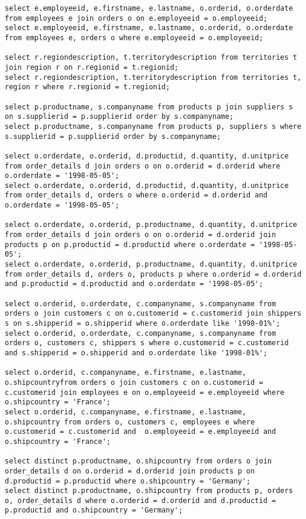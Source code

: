 \documentclass{article}
\begin{document}
        \begin{lstlisting}
select e.employeeid, e.firstname, e.lastname, o.orderid, o.orderdate from employees e join orders o on e.employeeid = o.employeeid;
select e.employeeid, e.firstname, e.lastname, o.orderid, o.orderdate from employees e, orders o where e.employeeid = o.employeeid;

select r.regiondescription, t.territorydescription from territories t join region r on r.regionid = t.regionid;
select r.regiondescription, t.territorydescription from territories t, region r where r.regionid = t.regionid;

select p.productname, s.companyname from products p join suppliers s on s.supplierid = p.supplierid order by s.companyname;
select p.productname, s.companyname from products p, suppliers s where s.supplierid = p.supplierid order by s.companyname;

select o.orderdate, o.orderid, d.productid, d.quantity, d.unitprice from order_details d join orders o on o.orderid = d.orderid where o.orderdate = '1998-05-05';
select o.orderdate, o.orderid, d.productid, d.quantity, d.unitprice from order_details d, orders o where o.orderid = d.orderid and o.orderdate = '1998-05-05';

select o.orderdate, o.orderid, p.productname, d.quantity, d.unitprice from order_details d join orders o on o.orderid = d.orderid join products p on p.productid = d.productid where o.orderdate = '1998-05-05';
select o.orderdate, o.orderid, p.productname, d.quantity, d.unitprice from order_details d, orders o, products p where o.orderid = d.orderid and p.productid = d.productid and o.orderdate = '1998-05-05';

select o.orderid, o.orderdate, c.companyname, s.companyname from orders o join customers c on o.customerid = c.customerid join shippers s on s.shipperid = o.shipperid where o.orderdate like '1998-01%';
select o.orderid, o.orderdate, c.companyname, s.companyname from orders o, customers c, shippers s where o.customerid = c.customerid and s.shipperid = o.shipperid and o.orderdate like '1998-01%';

select o.orderid, c.companyname, e.firstname, e.lastname, o.shipcountryfrom orders o join customers c on o.customerid = c.customerid join employees e on o.employeeid = e.employeeid where o.shipcountry = 'France';
select o.orderid, c.companyname, e.firstname, e.lastname, o.shipcountry from orders o, customers c, employees e where o.customerid = c.customerid and  o.employeeid = e.employeeid and o.shipcountry = 'France';

select distinct p.productname, o.shipcountry from orders o join order_details d on o.orderid = d.orderid join products p on  d.productid = p.productid where o.shipcountry = 'Germany'; 
select distinct p.productname, o.shipcountry from products p, orders o, order_details d where o.orderid = d.orderid and d.productid = p.productid and o.shipcountry = 'Germany'; 
        \end{lstlisting}
\end{document}
